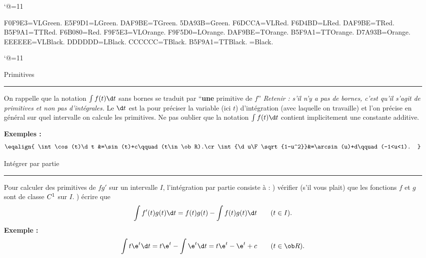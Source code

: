 \catcode`@=11\relax
\def\Api{Mathematicon@Api}%



\DefineRGBcolor F0F9E3=VLGreen.
\DefineRGBcolor E5F9D1=LGreen.
\DefineRGBcolor DAF9BE=TGreen.
\DefineRGBcolor 5DA93B=Green.
\DefineRGBcolor F6DCCA=VLRed.
\DefineRGBcolor F6D4BD=LRed.
\DefineRGBcolor DAF9BE=TRed.
\DefineRGBcolor B5F9A1=TTRed.
\DefineRGBcolor F6B080=Red.
\DefineRGBcolor F9F5E3=VLOrange.
\DefineRGBcolor F9F5D0=LOrange.
\DefineRGBcolor DAF9BE=TOrange.
\DefineRGBcolor B5F9A1=TTOrange.
\DefineRGBcolor D7A93B=Orange.
\DefineRGBcolor EEEEEE=VLBlack.
\DefineRGBcolor DDDDDD=LBlack.
\DefineRGBcolor CCCCCC=TBlack.
\DefineRGBcolor B5F9A1=TTBlack.
=Black.


\catcode`@=11\relax


\vglue-10mm%
\bigskip
\vfill



\centerline{Primitives}
\hrule
\medskip\noindent
On rappelle que la notation $\int f(t)\d t$ sans bornes se traduit par ``{\bf une} primitive de $f$'' \pn 
{\it  Retenir : s'il n'y a pas de bornes, c'est qu'il s'agit de primitives et non pas d'int\'egrales. }
\medskip 
Le $\d t$ est la pour pr\'eciser la variable (ici $t$) d'int\'egration (avec laquelle on travaille) et 
l'on pr\'ecise en g\'en\'eral sur quel intervalle on calcule les primitives. \medskip
\noindent
Ne pas oublier que la notation  $\int f(t)\d t$ contient  implicitement une constante additive.
\medskip

\noindent
{\bf Exemples : }
$$
\eqalign{
\int\cos(t)\d t &=\sin(t)+c\qquad(t\in\ob R).\cr
\int{\d u\F\sqrt{1-u^2}}&=\arcsin(u)+d\qquad(-1<u<1).
}
$$
\bigskip
\centerline{Int\'egrer par partie}
\hrule
\medskip\noindent
Pour calculer des primitives de $fg'$ sur un intervalle $I$, l'int\'egration par partie consiste \`a : ) v\'erifier (s'il vous plait) que les fonctions $f$ et $g$ sont de classe $\sc C^1$ sur $I$. ) \'ecrire que  
$$
\int f'(t)g(t)\d t=f(t)g(t)-\int f(t)g(t)\d t\qquad(t\in I).
$$
{\bf Exemple : }
$$
\int t\e^t\d t=t\e^t-\int \e^t\d t=t\e^t-\e^t+c\qquad (t\in\ob R).
$$\bigskip


